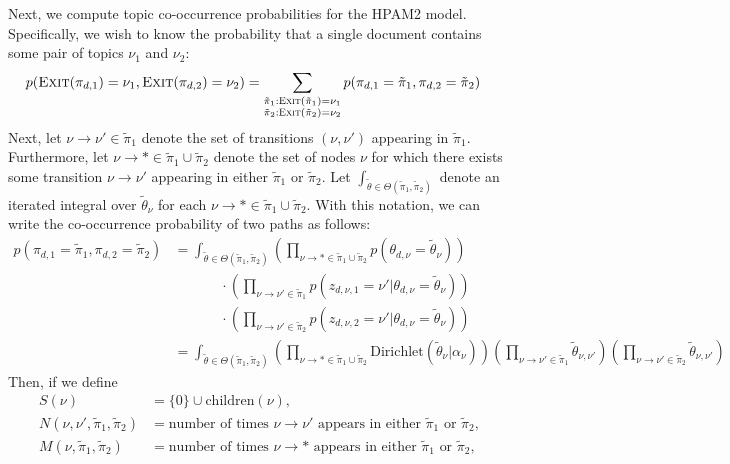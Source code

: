 \documentclass{article}
\newcommand{\Dirichlet}{\text{Dirichlet}}
\newcommand{\Exit}{\textsc{Exit}}
\begin{document}
Next, we compute topic co-occurrence probabilities for the HPAM2 model.
Specifically, we wish to know the probability that a single document contains some pair of topics $\nu_1$ and $\nu_2$:
\begin{align}
p(\Exit(\pi_{d,1}) = \nu_1,
  \Exit(\pi_{d,2}) = \nu_2)
&=
\sum_{
  \substack{
    \tilde\pi_1 : \Exit(\tilde\pi_1) = \nu_1
    \\
    \tilde\pi_2 : \Exit(\tilde\pi_2) = \nu_2
  }
}
p(\pi_{d,1} = \tilde\pi_1, \pi_{d,2} = \tilde\pi_2)
\end{align}
Next, let $\nu \to \nu' \in \tilde\pi_1$ denote the set of transitions $(\nu, \nu')$ appearing in $\tilde\pi_1$.
Furthermore, let $\nu \to * \in \tilde\pi_1 \cup \tilde\pi_2$ denote the set of nodes $\nu$ for which there exists some transition $\nu \to \nu'$ appearing in either $\tilde\pi_1$ or $\tilde\pi_2$.
Let $\int_{\tilde\theta \in \Theta(\tilde\pi_1, \tilde\pi_2)}$ denote an iterated integral over $\tilde\theta_\nu$ for each $\nu \to * \in \tilde\pi_1 \cup \tilde\pi_2$.
With this notation, we can write the co-occurrence probability of two paths as follows:
\begin{align}
p(\pi_{d,1} = \tilde\pi_1, \pi_{d,2} = \tilde\pi_2)
&=
\int_{\tilde\theta \in \Theta(\tilde\pi_1, \tilde\pi_2)}
  \left(
    \prod_{\nu \to * \in \tilde\pi_1 \cup \tilde\pi_2}
    p(\theta_{d,\nu} = \tilde\theta_\nu)
  \right)
  \\ &\phantom{=}\qquad \cdot
  \left(
    \prod_{\nu \to \nu' \in \tilde\pi_1}
    p(z_{d,\nu,1} = \nu' | \theta_{d,\nu} = \tilde\theta_\nu)
  \right)
  \\ &\phantom{=}\qquad \cdot
  \left(
    \prod_{\nu \to \nu' \in \tilde\pi_2}
    p(z_{d,\nu,2} = \nu' | \theta_{d,\nu} = \tilde\theta_\nu)
  \right)
\\
&=
\int_{\tilde\theta \in \Theta(\tilde\pi_1, \tilde\pi_2)}
  \left(
    \prod_{\nu \to * \in \tilde\pi_1 \cup \tilde\pi_2}
    \Dirichlet(\tilde\theta_\nu | \alpha_\nu)
  \right)
  \left(
    \prod_{\nu \to \nu' \in \tilde\pi_1}
    \tilde\theta_{\nu,\nu'}
  \right)
  \left(
    \prod_{\nu \to \nu' \in \tilde\pi_2}
    \tilde\theta_{\nu,\nu'}
  \right)
\end{align}
Then, if we define
\begin{align}
S(\nu) &= \{0\} \cup \text{children}(\nu), \\
N(\nu,\nu',\tilde\pi_1,\tilde\pi_2) &= \text{number of times $\nu \to \nu'$ appears in either $\tilde\pi_1$ or $\tilde\pi_2$}, \\
M(\nu,\tilde\pi_1,\tilde\pi_2) &= \text{number of times $\nu \to *$ appears in either $\tilde\pi_1$ or $\tilde\pi_2$},
\end{align}
\end{document}
